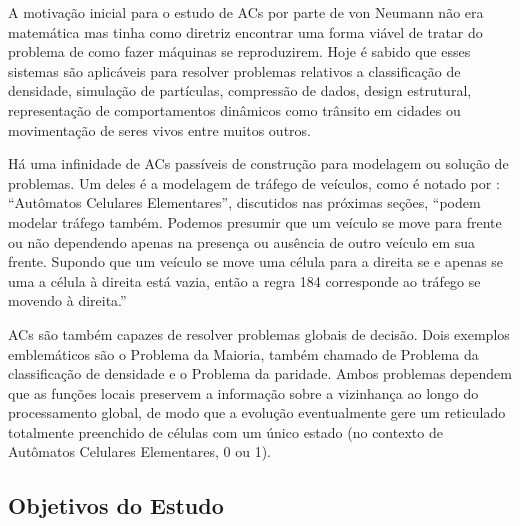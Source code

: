 \documentclass[a4paper,12pt]{ltxdoc}
\newcommand\tab[1][1cm]{\hspace*{#1}}
\begin{document}
\tab A motivação inicial para o estudo de ACs por parte de von Neumann não era matemática mas tinha como diretriz encontrar uma forma viável de tratar do problema de como fazer máquinas se reproduzirem. Hoje é sabido que esses sistemas são aplicáveis para resolver problemas relativos a classificação de densidade, simulação de partículas, compressão de dados, design estrutural, representação de comportamentos dinâmicos como trânsito em cidades ou movimentação de seres vivos entre muitos outros.

\tab Há uma infinidade de ACs passíveis de construção para modelagem ou solução de problemas. Um deles é a modelagem de tráfego de veículos, como é notado por \cite[p. 307]{rosenblueth2011model}:  ``Autômatos Celulares Elementares'', discutidos nas próximas seções, ``podem modelar tráfego também. Podemos presumir que um veículo se move para frente ou não dependendo apenas na presença ou ausência de outro veículo em sua frente. Supondo que um veículo se move uma célula para a direita se e apenas se uma a célula à direita está vazia, então a regra 184 corresponde ao tráfego se movendo à direita.''


\tab ACs são também capazes de resolver problemas globais de decisão. Dois exemplos emblemáticos são o Problema da Maioria, também chamado de Problema da classificação de densidade e o Problema da paridade. Ambos problemas dependem que as funções locais preservem a informação sobre a vizinhança ao longo do processamento global, de modo que a evolução eventualmente gere um reticulado totalmente preenchido de células com um único estado (no contexto de Autômatos Celulares Elementares, 0 ou 1).


\subsection{Objetivos do Estudo} 
\end{document}
